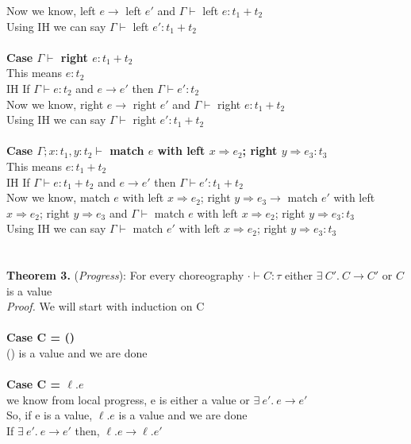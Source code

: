 \documentclass{article}
\begin{document}
Now we know, left $e \to$ left $e'$ and $\Gamma \vdash$ left $e : t_1+t_2$ \\
Using IH we can say $\Gamma \vdash$ left $ e' : t_1+t_2$ \\\\
\textbf{Case $\Gamma \vdash$ right $e : t_1+t_2$ } \\
This means $e : t_2$ \\
IH If $\Gamma \vdash e : t_2$ and  $e \to e'$ then $\Gamma \vdash e' : t_2$ \\
Now we know, right $e \to$ right $e'$ and $\Gamma \vdash$ right $e : t_1+t_2$ \\
Using IH we can say $\Gamma \vdash$ right $ e' : t_1+t_2$ \\
\\
\textbf{Case $\Gamma; x: t_1, y: t_2 \vdash$ match $e$ with left $x \Rightarrow e_2 $; right $ y \Rightarrow e_3 : t_3$ } \\
This means $e : t_1 + t_2$ \\
IH If $\Gamma \vdash e : t_1+t_2$ and  $e \to e'$ then $\Gamma \vdash e' : t_1+t_2$ \\
Now we know, match $e$ with left $x \Rightarrow e_2 $; right $ y \Rightarrow e_3 \to$
match $e'$ with left $x \Rightarrow e_2 $; right $ y \Rightarrow e_3$ and $\Gamma \vdash$ match $e$ with left $x \Rightarrow e_2 $; right $ y \Rightarrow e_3 : t_3$ \\
Using IH we can say $\Gamma \vdash$ match $e'$ with left $x \Rightarrow e_2 $; right $ y \Rightarrow e_3 : t_3$ 
\\\\
\\
\textbf{Theorem 3.} (\textit{Progress}): For every choreography $\cdot \vdash C : \tau$ either $  \exists \ C'.\ C \to C'$  or $C$ is a value
  \\
\textit{Proof.} We will start with induction on C \\\\
\textbf{Case C = ()} \\
() is a value and we are done \\ \\
\textbf{Case C = $\ell.e$} \\
we know from local progress, e is either a value or $ \exists \ e'.\ e \to e'$  \\
So, if e is a value, $\ell.e$ is a value and we are done \\
If $ \exists \ e'.\ e \to e'$ then, $ \ell. e \to \ell.e'$
\\ \\
\end{document}
